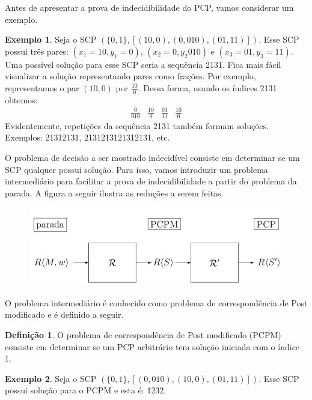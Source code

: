 \documentclass[a4paper]{article}
\theoremstyle{definition}
\newtheorem{Example}{Exemplo}
\newtheorem{Definition}{Definição}
\begin{document}
  Antes de apresentar a prova de indecidibilidade do PCP, vamos considerar um
  exemplo.

  \begin{Example}
    Seja o SCP $(\{0,1\}, [(10,0), (0,010), (01,11)])$. Esse SCP possui três
    pares: $(x_1 = 10, y_1 = 0)$, $(x_2 = 0, y_2 010)$ e $(x_3 = 01, y_3 = 11)$.
    Uma possível solução para esse SCP seria a sequência 2131. Fica mais fácil
    visualizar a solução representando pares como frações. Por exemplo,
    representamos o par $(10,0)$ por $\frac{10}{0}$. Dessa forma, usando os
    índices 2131 obtemos:
    \[
      \begin{array}{cccc}
        \frac{0}{010} &
        \frac{10}{0}  & 
        \frac{01}{11} &
        \frac{10}{0}
      \end{array}
    \]
    Evidentemente, repetições da sequência 2131 também formam soluções.
    Exemplos: 21312131, 2131213121312131, etc.
  \end{Example}

  O problema de decisão a ser mostrado indecidível consiste em determinar se um
  SCP qualquer possui solução. Para isso, vamos introduzir um problema
  intermediário para facilitar a prova de indecidibilidade a partir do problema
  da parada. A figura a seguir ilustra as reduções a serem feitas.

  \begin{figure}[H]
    \includegraphics[scale=.35]{reductions.png}
    \centering
  \end{figure}

  O problema intermediário é conhecido como problema de correspondência de Post
  modificado e é definido a seguir.

  \begin{Definition}
    O problema de correspondência de Post modificado (PCPM) consiste em
    determinar se um PCP arbitrário tem solução iniciada com o índice 1.
  \end{Definition}

  \begin{Example}
    Seja o SCP $(\{0,1\}, [(0,010), (10,0), (01,11)])$. Esse SCP possui solução
    para o PCPM e esta é: 1232.
  \end{Example}
\end{document}

